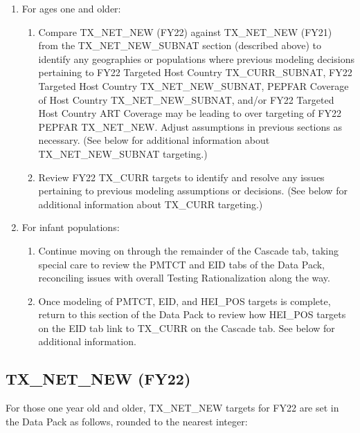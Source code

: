 \documentclass[
  openany]{book}
\begin{document}
\begin{enumerate}
\def\labelenumi{\arabic{enumi}.}
\item
  For ages one and older:

  \begin{enumerate}
  \def\labelenumii{\alph{enumii}.}
  \item
    Compare TX\_NET\_NEW (FY22) against TX\_NET\_NEW (FY21) from the
    TX\_NET\_NEW\_SUBNAT section (described above) to identify any
    geographies or populations where previous modeling decisions
    pertaining to FY22 Targeted Host Country TX\_CURR\_SUBNAT, FY22
    Targeted Host Country TX\_NET\_NEW\_SUBNAT, PEPFAR Coverage of Host
    Country TX\_NET\_NEW\_SUBNAT, and/or FY22 Targeted Host Country ART
    Coverage may be leading to over targeting of FY22 PEPFAR
    TX\_NET\_NEW. Adjust assumptions in previous sections as
    necessary. (See below for additional information about
    TX\_NET\_NEW\_SUBNAT targeting.)
  \item
    Review FY22 TX\_CURR targets to identify and resolve any issues
    pertaining to previous modeling assumptions or decisions. (See
    below for additional information about TX\_CURR targeting.)
  \end{enumerate}
\item
  For infant populations:

  \begin{enumerate}
  \def\labelenumii{\alph{enumii}.}
  \item
    Continue moving on through the remainder of the Cascade tab,
    taking special care to review the PMTCT and EID tabs of the Data
    Pack, reconciling issues with overall Testing Rationalization
    along the way.
  \item
    Once modeling of PMTCT, EID, and HEI\_POS targets is complete,
    return to this section of the Data Pack to review how HEI\_POS
    targets on the EID tab link to TX\_CURR on the Cascade tab. See
    below for additional information.
  \end{enumerate}
\end{enumerate}

\hypertarget{tx_net_new-fy22}{%
\subsection{TX\_NET\_NEW (FY22)}\label{tx_net_new-fy22}}

For those one year old and older, TX\_NET\_NEW targets for FY22 are set in
the Data Pack as follows, rounded to the nearest integer:
\end{document}
